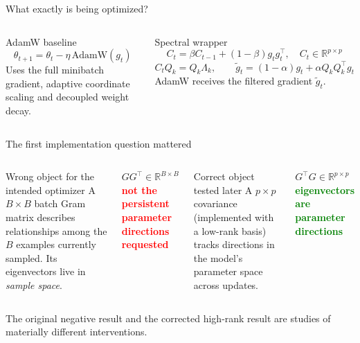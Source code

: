 \documentclass[aspectratio=169,10pt]{beamer}
\newcommand{\good}[1]{\textcolor{green}{\textbf{#1}}}
\newcommand{\bad}[1]{\textcolor{red}{\textbf{#1}}}
\begin{document}
\begin{frame}{What exactly is being optimized?}
  \begin{columns}[c]
    \begin{block}{AdamW baseline}
      \[\theta_{t+1}=\theta_t-\eta\,\mathrm{AdamW}(g_t)\]
      Uses the full minibatch gradient, adaptive coordinate scaling and decoupled weight decay.
    \end{block}
    \begin{block}{Spectral wrapper}
      \[C_t=\beta C_{t-1}+(1-\beta)g_tg_t^\top,\quad C_t\in\mathbb{R}^{p\times p}\]
      \[C_tQ_k=Q_k\Lambda_k,\qquad \tilde g_t=(1-\alpha)g_t+\alpha Q_kQ_k^\top g_t\]
      AdamW receives the filtered gradient $\tilde g_t$.
    \end{block}
  \end{columns}
\end{frame}

\begin{frame}{The first implementation question mattered}
  \begin{columns}[T]
    \begin{block}{Wrong object for the intended optimizer}
      A $B\times B$ batch Gram matrix describes relationships among the $B$ examples currently sampled. Its eigenvectors live in \emph{sample space}.
    \end{block}
    \centering
    $G G^\top\in\mathbb{R}^{B\times B}$\\[0.4em]
    \bad{not the persistent parameter directions requested}
    \begin{block}{Correct object tested later}
      A $p\times p$ covariance (implemented with a low-rank basis) tracks directions in the model's parameter space across updates.
    \end{block}
    \centering
    $G^\top G\in\mathbb{R}^{p\times p}$\\[0.4em]
    \good{eigenvectors are parameter directions}
  \end{columns}
  \vspace{0.8em}
  \centering\large The original negative result and the corrected high-rank result are studies of materially different interventions.
\end{frame}
\end{document}
